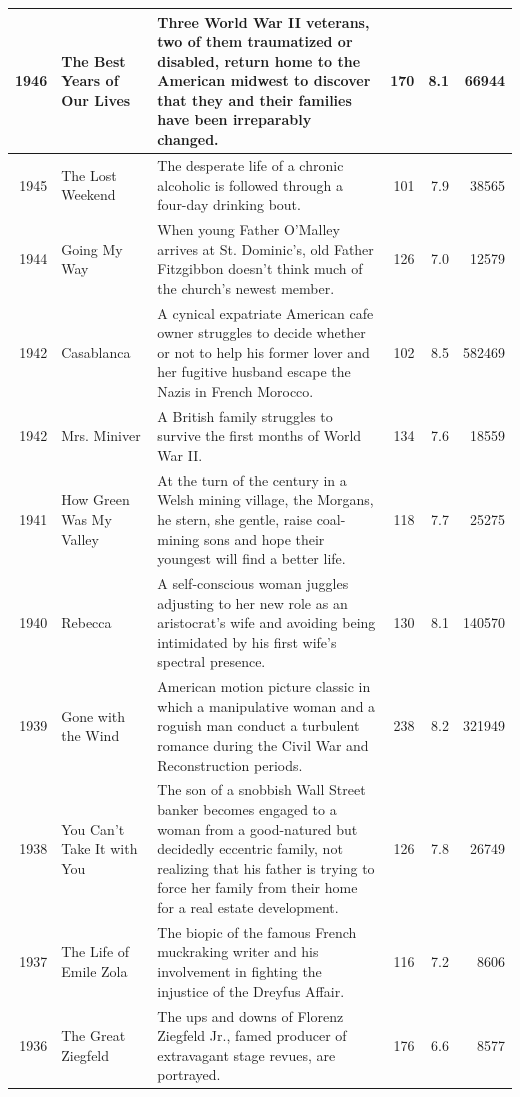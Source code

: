 \documentclass[
]{book}
\begin{document}
\begin{tabular}{r|l|l|r|r|r}
\hline
1946 & The Best Years of Our Lives & Three World War II veterans, two of them traumatized or disabled, return home to the American midwest to discover that they and their families have been irreparably changed. & 170 & 8.1 & 66944\\
\hline
1945 & The Lost Weekend & The desperate life of a chronic alcoholic is followed through a four-day drinking bout. & 101 & 7.9 & 38565\\
\hline
1944 & Going My Way & When young Father O'Malley arrives at St. Dominic's, old Father Fitzgibbon doesn't think much of the church's newest member. & 126 & 7.0 & 12579\\
\hline
1942 & Casablanca & A cynical expatriate American cafe owner struggles to decide whether or not to help his former lover and her fugitive husband escape the Nazis in French Morocco. & 102 & 8.5 & 582469\\
\hline
1942 & Mrs. Miniver & A British family struggles to survive the first months of World War II. & 134 & 7.6 & 18559\\
\hline
1941 & How Green Was My Valley & At the turn of the century in a Welsh mining village, the Morgans, he stern, she gentle, raise coal-mining sons and hope their youngest will find a better life. & 118 & 7.7 & 25275\\
\hline
1940 & Rebecca & A self-conscious woman juggles adjusting to her new role as an aristocrat's wife and avoiding being intimidated by his first wife's spectral presence. & 130 & 8.1 & 140570\\
\hline
1939 & Gone with the Wind & American motion picture classic in which a manipulative woman and a roguish man conduct a turbulent romance during the Civil War and Reconstruction periods. & 238 & 8.2 & 321949\\
\hline
1938 & You Can't Take It with You & The son of a snobbish Wall Street banker becomes engaged to a woman from a good-natured but decidedly eccentric family, not realizing that his father is trying to force her family from their home for a real estate development. & 126 & 7.8 & 26749\\
\hline
1937 & The Life of Emile Zola & The biopic of the famous French muckraking writer and his involvement in fighting the injustice of the Dreyfus Affair. & 116 & 7.2 & 8606\\
\hline
1936 & The Great Ziegfeld & The ups and downs of Florenz Ziegfeld Jr., famed producer of extravagant stage revues, are portrayed. & 176 & 6.6 & 8577\\
\hline

\end{tabular}
\end{document}
